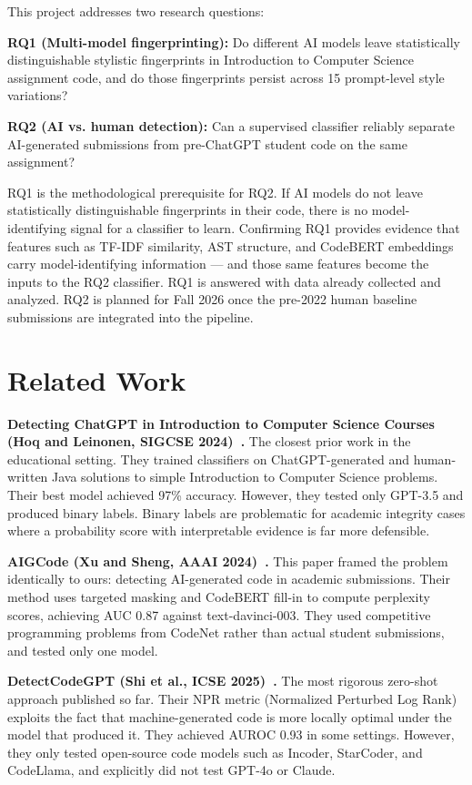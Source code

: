 \documentclass[sigconf]{acmart}
\begin{document}
This project addresses two research questions:

\textbf{RQ1 (Multi-model fingerprinting):} Do different AI models leave statistically distinguishable stylistic fingerprints in Introduction to Computer Science assignment code, and do those fingerprints persist across 15 prompt-level style variations?

\textbf{RQ2 (AI vs. human detection):} Can a supervised classifier reliably separate AI-generated submissions from pre-ChatGPT student code on the same assignment?

RQ1 is the methodological prerequisite for RQ2. If AI models do not leave statistically distinguishable fingerprints in their code, there is no model-identifying signal for a classifier to learn. Confirming RQ1 provides evidence that features such as TF-IDF similarity, AST structure, and CodeBERT embeddings carry model-identifying information --- and those same features become the inputs to the RQ2 classifier. RQ1 is answered with data already collected and analyzed. RQ2 is planned for Fall 2026 once the pre-2022 human baseline submissions are integrated into the pipeline.

\section{Related Work}

\textbf{Detecting ChatGPT in Introduction to Computer Science Courses (Hoq and Leinonen, SIGCSE 2024)~\cite{hoq2024detecting}.} The closest prior work in the educational setting. They trained classifiers on ChatGPT-generated and human-written Java solutions to simple Introduction to Computer Science problems. Their best model achieved 97\% accuracy. However, they tested only GPT-3.5 and produced binary labels. Binary labels are problematic for academic integrity cases where a probability score with interpretable evidence is far more defensible.

\textbf{AIGCode (Xu and Sheng, AAAI 2024)~\cite{xu2024detecting}.} This paper framed the problem identically to ours: detecting AI-generated code in academic submissions. Their method uses targeted masking and CodeBERT fill-in to compute perplexity scores, achieving AUC 0.87 against text-davinci-003. They used competitive programming problems from CodeNet rather than actual student submissions, and tested only one model.

\textbf{DetectCodeGPT (Shi et al., ICSE 2025)~\cite{shi2025between}.} The most rigorous zero-shot approach published so far. Their NPR metric (Normalized Perturbed Log Rank) exploits the fact that machine-generated code is more locally optimal under the model that produced it. They achieved AUROC 0.93 in some settings. However, they only tested open-source code models such as Incoder, StarCoder, and CodeLlama, and explicitly did not test GPT-4o or Claude.
\end{document}
